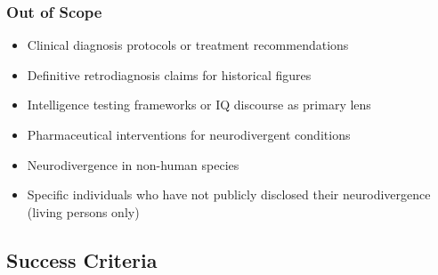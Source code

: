 \documentclass[11pt,letterpaper]{article}
\begin{document}
\subsubsection{Out of Scope}
\begin{itemize}[leftmargin=*]
  \item Clinical diagnosis protocols or treatment recommendations
  \item Definitive retrodiagnosis claims for historical figures
  \item Intelligence testing frameworks or IQ discourse as primary lens
  \item Pharmaceutical interventions for neurodivergent conditions
  \item Neurodivergence in non-human species
  \item Specific individuals who have not publicly disclosed their neurodivergence (living persons only)
\end{itemize}

\subsection{Success Criteria}
\end{document}
